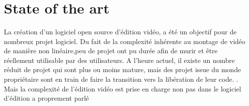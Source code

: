 \section {State of the art}
\paragraph{}
  La cr\'eation d'un logiciel open source d'\'edition vid\'eo, a \'et\'e un objectif pour de nombreux
  projet logiciel. Du fait de la complexit\'e inh\'erente au montage de vid\'eo de manière non
  lin\'eaire,peu de projet ont pu dur\'ee afin de murir et être r\'eellement utilisable par des
  utilisateurs. A l'heure actuel, il existe un nombre r\'eduit de projet qui sont plus ou 
  moins mature, mais des projet issue du monde propri\'etaire sont en train de faire la 
  transition vers la lib\'eration de leur code. \cite{XXXXXXXXX}. Mais la complexit\'e de 
  l'\'edition vid\'eo est prise en charge non pas dans le logiciel d'\'edition a proprement
  parl\'e 

